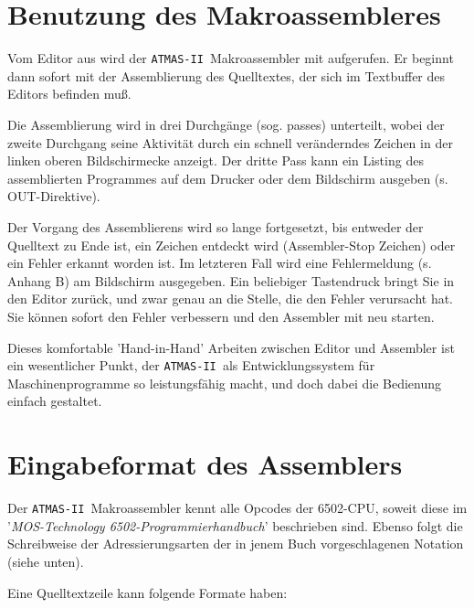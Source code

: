 \documentclass[10pt,a4paper,twoside,final,openright,titlepage]{memoir}
\def\atmas{\texttt{AT\-MAS-II }}
\newcommand{\key}[1]{\keystroke{\tiny #1}}
\begin{document}
\section{Benutzung des Makroassembleres}

Vom Editor aus wird der \atmas Makroassembler mit \key{CTRL-Y}
aufgerufen. Er beginnt dann sofort mit der Assemblierung des Quelltextes, der sich im Textbuffer des
Editors befinden muß.

Die Assemblierung wird in drei Durchgänge (sog.
passes) unterteilt, wobei der zweite Durchgang seine
Aktivität durch ein schnell veränderndes Zeichen in
der linken oberen Bildschirmecke anzeigt. Der dritte
Pass kann ein Listing des assemblierten Programmes auf
dem Drucker oder dem Bildschirm ausgeben (s. OUT-Direktive).

Der Vorgang des Assemblierens wird so lange fortgesetzt, bis entweder der Quelltext zu Ende ist, ein
\key {CTRL-Z} Zeichen entdeckt wird (Assembler-Stop
Zeichen) oder ein Fehler erkannt worden ist. Im
letzteren Fall wird eine Fehlermeldung (s. Anhang B)
am Bildschirm ausgegeben. Ein beliebiger Tastendruck
bringt Sie in den Editor zurück, und zwar genau an die
Stelle, die den Fehler verursacht hat. Sie können
sofort den Fehler verbessern und den Assembler mit
\key{CTRL-Y} neu starten.

Dieses komfortable 'Hand-in-Hand' Arbeiten zwischen
Editor und Assembler ist ein wesentlicher Punkt, der
\atmas als Entwicklungssystem für Maschinenprogramme so leistungsfähig macht, und doch dabei die
Bedienung einfach gestaltet.

\section{Eingabeformat des Assemblers}

Der \atmas Makroassembler kennt alle Opcodes der
6502-CPU, soweit diese im '\textit{MOS-Technology 6502-Programmierhandbuch}' beschrieben sind. Ebenso folgt die
Schreibweise der Adressierungsarten der in jenem Buch
vorgeschlagenen Notation (siehe unten).

Eine Quelltextzeile kann folgende Formate haben:
\end{document}
